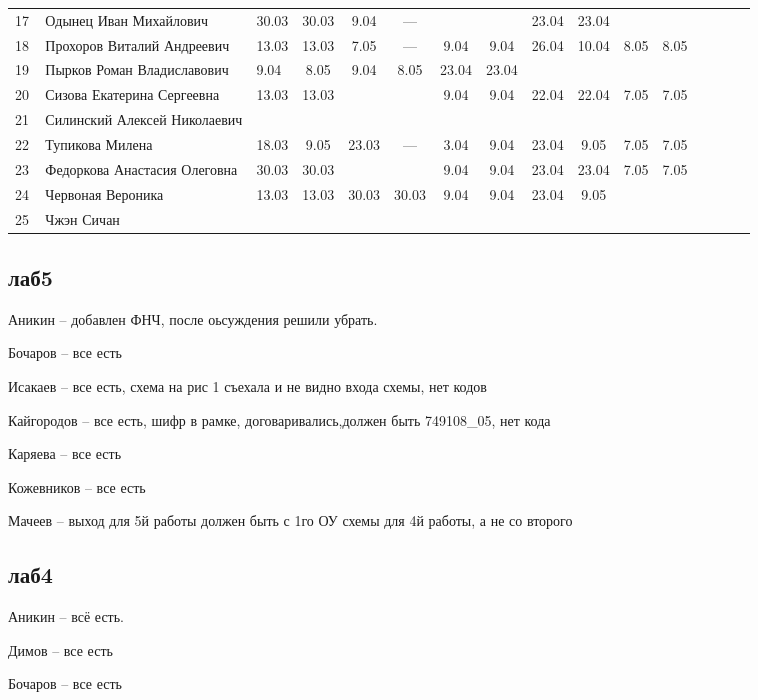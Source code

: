 \documentclass[a4paper,11pt]{article}
\begin{document}
\begin{tabular}{l|llccccccccccccc}
17\,&Одынец Иван Михайлович         &30.03&30.03 & 9.04& --- &     &     &23.04&23.04\\
18\,&Прохоров Виталий Андреевич     &13.03&13.03 & 7.05& --- & 9.04& 9.04&26.04&10.04& 8.05& 8.05\\
19\,&Пырков Роман Владиславович     & 9.04& 8.05 & 9.04& 8.05&23.04&23.04&&\\
20\,&Сизова Екатерина Сергеевна     &13.03&13.03 &     &     & 9.04& 9.04&22.04&22.04& 7.05& 7.05\\
\midrule
21\,&Силинский Алексей Николаевич   &     &      &     &     &     &     &     &\\
22\,&Тупикова Милена                &18.03& 9.05 &23.03& --- & 3.04& 9.04&23.04& 9.05& 7.05& 7.05\\
23\,&Федоркова Анастасия Олеговна   &30.03&30.03 &     &     & 9.04& 9.04&23.04&23.04& 7.05&7.05\\
24\,&Червоная Вероника              &13.03&13.03 &30.03&30.03& 9.04& 9.04&23.04& 9.05&     &\\
25\,&Чжэн Сичан                     &     &      &     &     &     &     &\\
\bottomrule
\end{tabular}

\newpage
{}
\recalctypearea
\subsection*{лаб5}
Аникин -- добавлен ФНЧ, после оьсуждения решили убрать.

Бочаров -- все есть

Исакаев -- все есть, схема на рис 1 съехала и не видно входа схемы, нет кодов

Кайгородов -- все есть, шифр в рамке, договаривались,должен быть 749108\_05, нет кода

Каряева -- все есть

Кожевников -- все есть

Мачеев -- выход для 5й работы должен быть с 1го ОУ схемы для 4й работы, а не со второго 

\newpage
\subsection*{лаб4}
Аникин -- всё есть.

Димов -- все есть

Бочаров -- все есть
\end{document}
